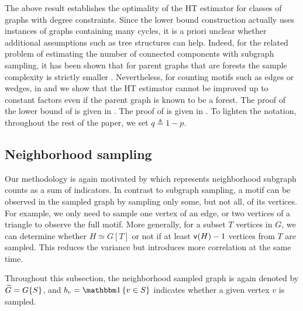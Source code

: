 
The above result establishes the optimality of the HT estimator for classes of graphs with degree constraints. 
Since the lower bound construction actually uses instances of graphs containing many cycles, it is a priori unclear whether additional assumptions such as tree structures can help. Indeed, for the related problem of estimating the number of connected components with subgraph sampling, it has been shown that for parent graphs that are forests the sample complexity is strictly smaller \cite{KlusowskiWu2017-cc}. 
Nevertheless, for counting motifs such as edges or wedges, in  and  we show that the HT estimator  cannot be improved up to constant factors even if the parent graph is known to be a forest. The proof of the lower bound of  is given in . The proof of  is given in . To lighten the notation, throughout the rest of the paper, we set $ q \triangleq 1 - p $.


\subsection{Neighborhood sampling}  \label{sec:neighborhood}

Our methodology is again motivated by  which represents neighborhood subgraph counts as a sum of indicators. In contrast to subgraph sampling, a motif can be observed in the sampled graph by sampling only some, but not all, of its vertices. For example, we only need to sample one vertex of an edge, or two vertices of a triangle to observe the full motif. More generally, for a subset $ T $ vertices in $ G $, we can determine whether $ H \simeq G[T] $ or not if at least $ {\mathsf{v}}(H) - 1 $ vertices from $ T $ are sampled. This reduces the variance but introduces more correlation at the same time.

Throughout this subsection, the neighborhood sampled graph is again denoted by ${\widetilde{G}} = G\{S\}$, and $b_v =\indc{v\in S}$ indicates whether a given vertex $v$ is sampled.

